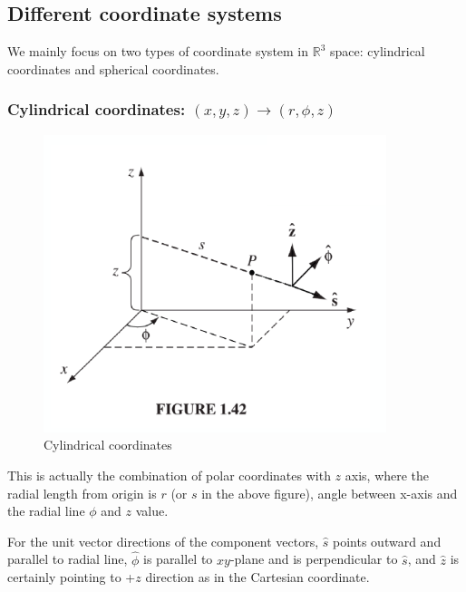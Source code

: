 \documentclass[12pt,a4paper,twoside]{article}
\numberwithin{equation}{section}
\begin{document}
	
	\subsection{Different coordinate systems}
	We mainly focus on two types of coordinate system in \(\mathbb{R}^3\) space: cylindrical coordinates and spherical coordinates.
	\subsubsection{Cylindrical coordinates: \((x,y,z)\rightarrow(r,\phi,z)\)}
	\begin{figure}[ht]
		\centering
		\includegraphics[width = 10cm]{250-Revision/cylindrical.png}
		\caption{Cylindrical coordinates}
		\label{fig:cylindrical}
	\end{figure}
	This is actually the combination of polar coordinates with $z$ axis, where the radial length from origin is $r$ (or $s$ in the above figure), angle between x-axis and the radial line \(\phi\) and $z$ value.
	
	For the unit vector directions of the component vectors, $\hat{s}$ points outward and parallel to radial line, $\hat{\phi}$ is parallel to $xy$-plane and is perpendicular to $\hat{s}$, and $\hat{z}$ is certainly pointing to +$z$ direction as in the Cartesian coordinate.\\
	
\end{document}
